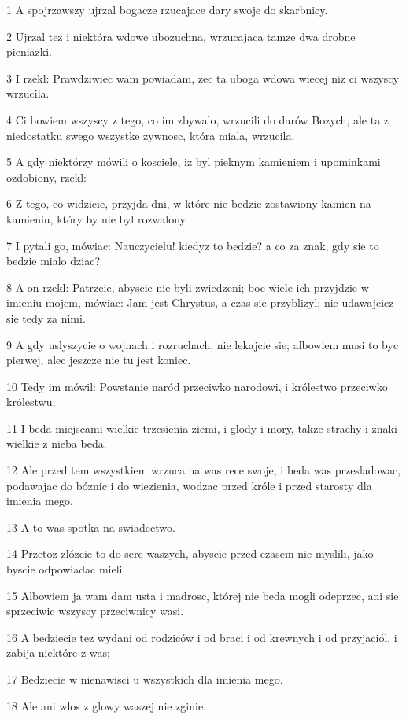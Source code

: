 \par 1 A spojrzawszy ujrzal bogacze rzucajace dary swoje do skarbnicy.
\par 2 Ujrzal tez i niektóra wdowe ubozuchna, wrzucajaca tamze dwa drobne pieniazki.
\par 3 I rzekl: Prawdziwiec wam powiadam, zec ta uboga wdowa wiecej niz ci wszyscy wrzucila.
\par 4 Ci bowiem wszyscy z tego, co im zbywalo, wrzucili do darów Bozych, ale ta z niedostatku swego wszystke zywnosc, która miala, wrzucila.
\par 5 A gdy niektórzy mówili o kosciele, iz byl pieknym kamieniem i upominkami ozdobiony, rzekl:
\par 6 Z tego, co widzicie, przyjda dni, w które nie bedzie zostawiony kamien na kamieniu, który by nie byl rozwalony.
\par 7 I pytali go, mówiac: Nauczycielu! kiedyz to bedzie? a co za znak, gdy sie to bedzie mialo dziac?
\par 8 A on rzekl: Patrzcie, abyscie nie byli zwiedzeni; boc wiele ich przyjdzie w imieniu mojem, mówiac: Jam jest Chrystus, a czas sie przyblizyl; nie udawajciez sie tedy za nimi.
\par 9 A gdy uslyszycie o wojnach i rozruchach, nie lekajcie sie; albowiem musi to byc pierwej, alec jeszcze nie tu jest koniec.
\par 10 Tedy im mówil: Powstanie naród przeciwko narodowi, i królestwo przeciwko królestwu;
\par 11 I beda miejscami wielkie trzesienia ziemi, i glody i mory, takze strachy i znaki wielkie z nieba beda.
\par 12 Ale przed tem wszystkiem wrzuca na was rece swoje, i beda was przesladowac, podawajac do bóznic i do wiezienia, wodzac przed króle i przed starosty dla imienia mego.
\par 13 A to was spotka na swiadectwo.
\par 14 Przetoz zlózcie to do serc waszych, abyscie przed czasem nie myslili, jako byscie odpowiadac mieli.
\par 15 Albowiem ja wam dam usta i madrosc, której nie beda mogli odeprzec, ani sie sprzeciwic wszyscy przeciwnicy wasi.
\par 16 A bedziecie tez wydani od rodziców i od braci i od krewnych i od przyjaciól, i zabija niektóre z was;
\par 17 Bedziecie w nienawisci u wszystkich dla imienia mego.
\par 18 Ale ani wlos z glowy waszej nie zginie.
